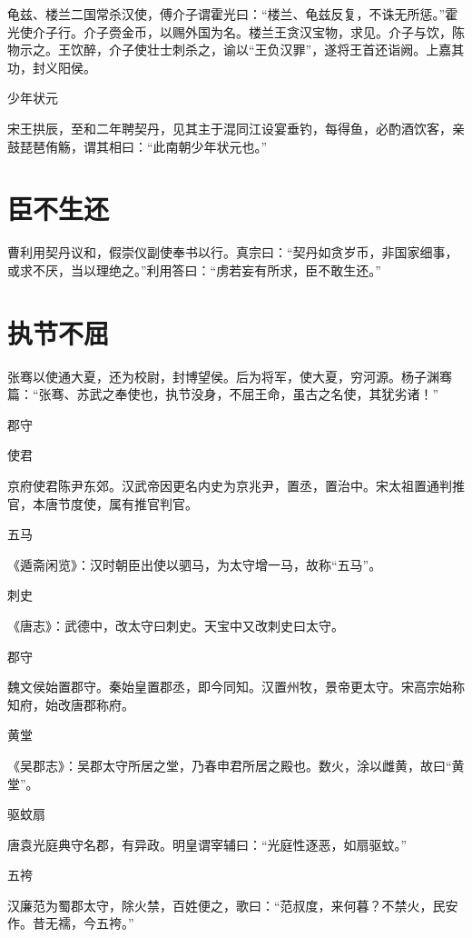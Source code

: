 \documentclass[a4paper,12pt,UTF8,twoside]{ctexbook}
\begin{document}
    龟兹、楼兰二国常杀汉使，傅介子谓霍光曰：“楼兰、龟兹反复，不诛无所惩。”霍光使介子行。介子赍金币，以赐外国为名。楼兰王贪汉宝物，求见。介子与饮，陈物示之。王饮醉，介子使壮士刺杀之，谕以“王负汉罪”，遂将王首还诣阙。上嘉其功，封义阳侯。
    
    少年状元
    
    宋王拱辰，至和二年聘契丹，见其主于混同江设宴垂钓，每得鱼，必酌酒饮客，亲鼓琵琶侑觞，谓其相曰：“此南朝少年状元也。”
    
    \section{臣不生还}
    
    曹利用契丹议和，假崇仪副使奉书以行。真宗曰：“契丹如贪岁币，非国家细事，或求不厌，当以理绝之。”利用答曰：“虏若妄有所求，臣不敢生还。”
    
    \section{执节不屈}
    
    张骞以使通大夏，还为校尉，封博望侯。后为将军，使大夏，穷河源。杨子渊骞篇：“张骞、苏武之奉使也，执节没身，不屈王命，虽古之名使，其犹劣诸！”
    
    郡守
    
    使君
    
    京府使君陈尹东郊。汉武帝因更名内史为京兆尹，置丞，置治中。宋太祖置通判推官，本唐节度使，属有推官判官。
    
    五马
    
    《遁斋闲览》：汉时朝臣出使以驷马，为太守增一马，故称“五马”。
    
    刺史
    
    《唐志》：武德中，改太守曰刺史。天宝中又改刺史曰太守。
    
    郡守
    
    魏文侯始置郡守。秦始皇置郡丞，即今同知。汉置州牧，景帝更太守。宋高宗始称知府，始改唐郡称府。
    
    黄堂
    
    《吴郡志》：吴郡太守所居之堂，乃春申君所居之殿也。数火，涂以雌黄，故曰“黄堂”。
    
    驱蚊扇
    
    唐袁光庭典守名郡，有异政。明皇谓宰辅曰：“光庭性逐恶，如扇驱蚊。”
    
    五袴
    
    汉廉范为蜀郡太守，除火禁，百姓便之，歌曰：“范叔度，来何暮？不禁火，民安作。昔无襦，今五袴。”
    
\end{document}
